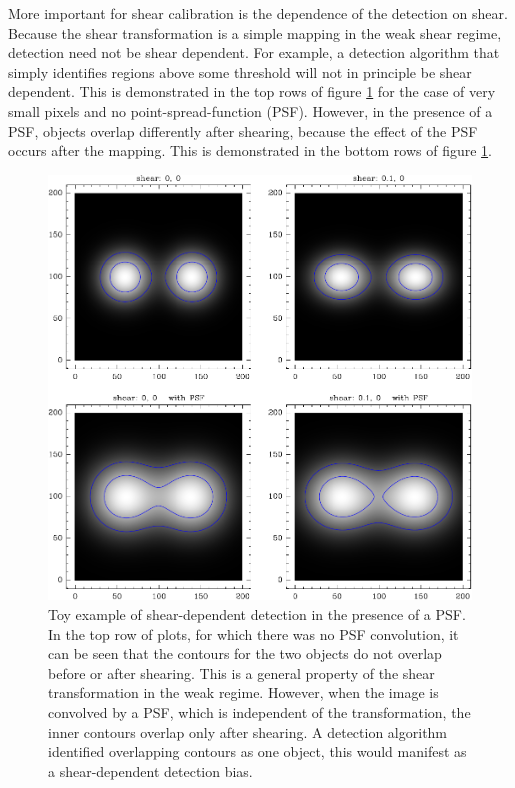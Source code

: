 \documentclass[fleqn,useAMS,usenatbib]{mnras}
\begin{document}
More important for shear calibration is the dependence of the detection on
shear.  Because the shear transformation is a simple mapping in the weak shear
regime, detection need not be shear dependent.  For example, a detection
algorithm that simply identifies regions above some threshold will not in
principle be shear dependent. This is demonstrated in the top rows of figure
\ref{fig:toy} for the case of very small pixels and no point-spread-function
(PSF).  However, in the presence of a PSF, objects overlap differently after
shearing, because the effect of the PSF occurs after the mapping.  This is
demonstrated in the bottom rows of figure \ref{fig:toy}.

\begin{figure}
    \includegraphics[width=\columnwidth]{figures/toy.pdf}

    \caption{ Toy example of shear-dependent detection in the presence of a
    PSF.  In the top row of plots, for which there was no PSF convolution, it
    can be seen that the contours for the two objects do not overlap before or
    after shearing. This is a general property of the shear transformation in
    the weak regime.  However, when the image is convolved by a PSF, which is
    independent of the transformation, the inner contours overlap only after
    shearing.  A detection algorithm identified overlapping contours as one
    object, this would manifest as a shear-dependent detection bias.
    \label{fig:toy} }

\end{figure}
\end{document}
